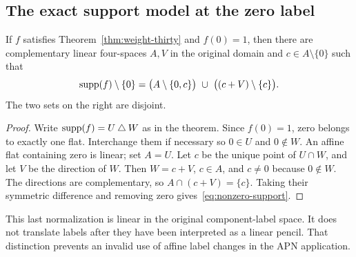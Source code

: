 \subsection{The exact support model at the zero label}
\begin{corollary}\label{cor:two-flat-model}
If $f$ satisfies Theorem~\ref{thm:weight-thirty} and $f(0)=1$, then there are complementary linear four-spaces $A,V$ in the original domain and $c\in A\setminus\{0\}$ such that
\begin{equation}\label{eq:nonzero-support}
\operatorname{supp}(f)\setminus\{0\}
=\bigl(A\setminus\{0,c\}\bigr)
\ \cup\ \bigl((c+V)\setminus\{c\}\bigr).
\end{equation}
The two sets on the right are disjoint.
\end{corollary}
\begin{proof}
Write $\operatorname{supp}(f)=U\mathbin{\triangle} W$ as in the theorem. Since $f(0)=1$, zero belongs to exactly one flat. Interchange them if necessary so $0\in U$ and $0\notin W$. An affine flat containing zero is linear; set $A=U$. Let $c$ be the unique point of $U\cap W$, and let $V$ be the direction of $W$. Then $W=c+V$, $c\in A$, and $c\ne0$ because $0\notin W$. The directions are complementary, so $A\cap(c+V)=\{c\}$. Taking their symmetric difference and removing zero gives~\eqref{eq:nonzero-support}.
\end{proof}
This last normalization is linear in the original component-label space. It does not translate labels after they have been interpreted as a linear pencil. That distinction prevents an invalid use of affine label changes in the APN application.
